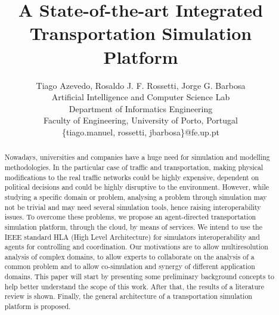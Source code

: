 \documentclass[conference]{IEEEtran}
\begin{document}
\pagestyle{plain}

\title{A State-of-the-art Integrated Transportation Simulation Platform\vspace{-2ex}}

\author{Tiago Azevedo, Rosaldo J. F. Rossetti, Jorge G. Barbosa\\Artificial Intelligence and Computer Science Lab\\Department of Informatics Engineering\\Faculty of Engineering, University of Porto, Portugal\\\{tiago.manuel, rossetti, jbarbosa\}@fe.up.pt}


\maketitle

\thispagestyle{plain}


\begin{abstract}
Nowadays, universities and companies have a huge need for simulation and modelling methodologies. In the particular case of traffic and transportation, making physical modifications to the real traffic networks could be highly expensive, dependent on political decisions and could be highly disruptive to the environment. 
However, while studying a specific domain or problem, analysing a problem through simulation may not be trivial and may need several simulation tools, hence raising interoperability issues.
To overcome these problems, we propose an agent-directed transportation simulation platform, through the cloud, by means of services. We intend to use the IEEE standard HLA (High Level Architecture) for simulators interoperability and agents for controlling and coordination. Our motivations are to allow multiresolution analysis of complex domains, to allow experts to collaborate on the analysis of a common problem and to allow co-simulation and synergy of different application domains.
This paper will start by presenting some preliminary background concepts to help better understand the scope of this work. After that, the results of a literature review is shown. Finally, the general architecture of a transportation simulation platform is proposed.
\end{abstract}
\end{document}
